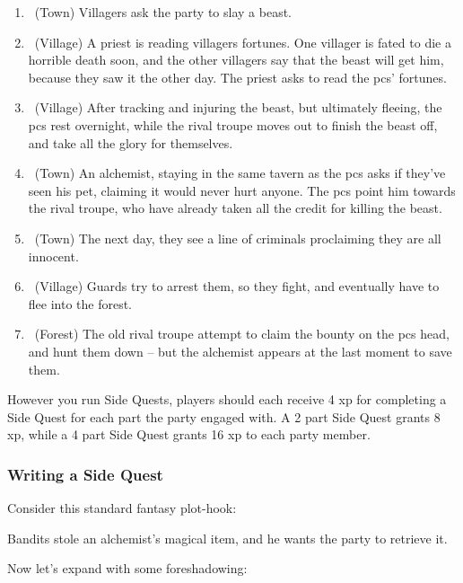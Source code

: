 \begin{multicols}{2}
\begin{enumerate}
  \item
  \sqr~(Town)
  Villagers ask the party to slay a beast.
  \item
  \sqr~(Village)
  A priest is reading villagers fortunes.
  One villager is fated to die a horrible death soon, and the other villagers say that the beast will get him, because they saw it the other day.
  The priest asks to read the \glspl{pc}' fortunes.
  \item
  \sqr~(Village)
  After tracking and injuring the beast, but ultimately fleeing, the \glspl{pc} rest overnight, while the rival troupe moves out to finish the beast off, and take all the glory for themselves.
  \item
  \sqr~(Town)
  An alchemist, staying in the same tavern as the \glspl{pc} asks if they've seen his pet, claiming it would never hurt anyone.
  The \glspl{pc} point him towards the rival troupe, who have already taken all the credit for killing the beast.
  \item
  \sqr~(Town)
  The next day, they see a line of criminals proclaiming they are all innocent.
  \item
  \sqr~(Village)
  Guards try to arrest them, so they fight, and eventually have to flee into the forest.
  \item
  \sqn~(Forest)
  The old rival troupe attempt to claim the bounty on the \glspl{pc} head, and hunt them down -- but the alchemist appears at the last moment to save them.

\end{enumerate}
\noindent

However you run Side Quests, players should each receive 4 \gls{xp} for completing a Side Quest for each part the party engaged with.
A 2 part Side Quest grants 8 \gls{xp}, while a 4 part Side Quest grants 16 \gls{xp} to each party member.

\subsubsection{Writing a Side Quest}

Consider this standard fantasy plot-hook:

\begin{exampletext}

  Bandits stole an alchemist's magical item, and he wants the party to retrieve it.

\end{exampletext}

Now let's expand with some foreshadowing:


\end{multicols}
